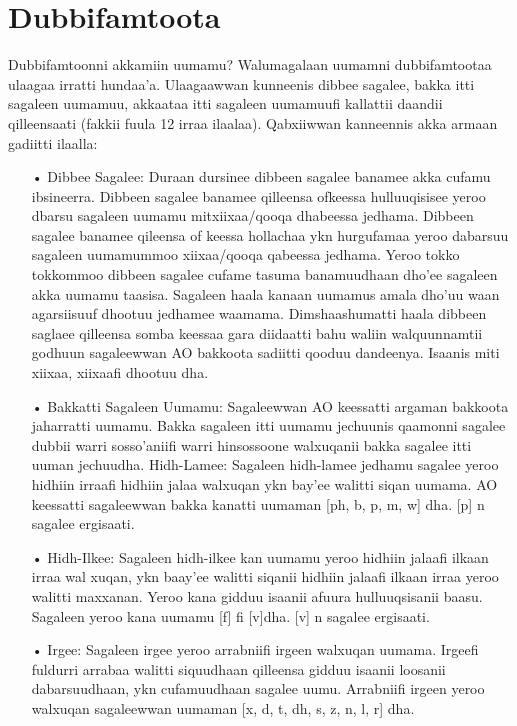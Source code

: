 \documentclass[11pt,b5paper]{book}
\begin{document}
\section{Dubbifamtoota}

Dubbifamtoonni akkamiin uumamu? Walumagalaan uumamni dubbifamtootaa ulaagaa irratti hundaa’a.  Ulaagaawwan kunneenis dibbee sagalee, bakka itti sagaleen uumamuu, akkaataa itti sagaleen uumamuufi kallattii daandii qilleensaati (fakkii fuula 12 irraa ilaalaa). Qabxiiwwan kanneennis akka armaan gadiitti ilaalla: 

\begin{itemize}

\item[•] Dibbee Sagalee: Duraan dursinee dibbeen sagalee banamee akka cufamu ibsineerra.  Dibbeen sagalee banamee qilleensa ofkeessa hulluuqisisee yeroo dbarsu 
sagaleen uumamu mitxiixaa/qooqa dhabeessa jedhama.  Dibbeen sagalee banamee qileensa of keessa hollachaa ykn hurgufamaa yeroo dabarsuu sagaleen uumamummoo xiixaa/qooqa qabeessa jedhama. Yeroo tokko tokkommoo dibbeen sagalee cufame tasuma banamuudhaan dho’ee sagaleen akka uumamu taasisa.  Sagaleen haala kanaan uumamus amala dho’uu waan agarsiisuuf dhootuu jedhamee waamama.  Dimshaashumatti haala dibbeen saglaee qilleensa somba keessaa gara diidaatti bahu waliin walquunnamtii godhuun sagaleewwan AO bakkoota sadiitti qooduu dandeenya.  Isaanis miti xiixaa, xiixaafi dhootuu dha. 

\item[•] Bakkatti Sagaleen Uumamu: Sagaleewwan AO keessatti argaman bakkoota jaharratti uumamu.  Bakka sagaleen itti uumamu jechuunis qaamonni sagalee dubbii warri sosso’aniifi warri hinsossoone walxuqanii bakka sagalee itti uuman jechuudha. 
Hidh-Lamee: Sagaleen hidh-lamee jedhamu sagalee yeroo hidhiin irraafi hidhiin jalaa walxuqan ykn bay’ee walitti siqan uumama. AO keessatti sagaleewwan bakka kanatti uumaman [ph, b, p, m, w] dha.  [p] n sagalee ergisaati.

\item[•] Hidh-Ilkee: Sagaleen hidh-ilkee kan uumamu yeroo hidhiin jalaafi ilkaan irraa wal xuqan, ykn baay’ee walitti siqanii hidhiin jalaafi ilkaan irraa yeroo walitti maxxanan. Yeroo kana gidduu isaanii afuura hulluuqsisanii baasu. Sagaleen yeroo kana uumamu [f] fi [v]dha. [v] n sagalee ergisaati. 

\item[•] Irgee: Sagaleen irgee yeroo arrabniifi irgeen walxuqan uumama.  Irgeefi fuldurri arrabaa walitti siquudhaan qilleensa gidduu isaanii loosanii dabarsuudhaan, ykn cufamuudhaan sagalee uumu.  Arrabniifi irgeen yeroo walxuqan sagaleewwan uumaman [x, d, t, dh, s, z, n, l, r] dha.  


\end{itemize}
\end{document}
